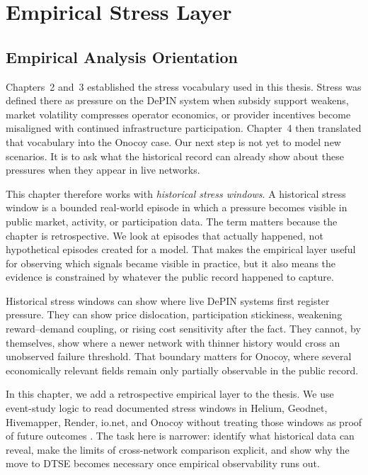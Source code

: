 \section{Empirical Stress Layer}
\label{sec:empirical_stress_layer}

\subsection{Empirical Analysis Orientation}
Chapters~2 and~3 established the stress vocabulary used in this thesis. Stress was defined there as pressure on the DePIN system when subsidy support weakens, market volatility compresses operator economics, or provider incentives become misaligned with continued infrastructure participation. Chapter~4 then translated that vocabulary into the Onocoy case. Our next step is not yet to model new scenarios. It is to ask what the historical record can already show about these pressures when they appear in live networks.

This chapter therefore works with \emph{historical stress windows}. A historical stress window is a bounded real-world episode in which a pressure becomes visible in public market, activity, or participation data. The term matters because the chapter is retrospective. We look at episodes that actually happened, not hypothetical episodes created for a model. That makes the empirical layer useful for observing which signals became visible in practice, but it also means the evidence is constrained by whatever the public record happened to capture.

Historical stress windows can show where live DePIN systems first register pressure. They can show price dislocation, participation stickiness, weakening reward--demand coupling, or rising cost sensitivity after the fact. They cannot, by themselves, show where a newer network with thinner history would cross an unobserved failure threshold. That boundary matters for Onocoy, where several economically relevant fields remain only partially observable in the public record.

In this chapter, we add a retrospective empirical layer to the thesis. We use event-study logic to read documented stress windows in Helium, Geodnet, Hivemapper, Render, io.net, and Onocoy without treating those windows as proof of future outcomes \cite{MacKinlay1997, FrontiersDePIN2025}. The task here is narrower: identify what historical data can reveal, make the limits of cross-network comparison explicit, and show why the move to DTSE becomes necessary once empirical observability runs out.

